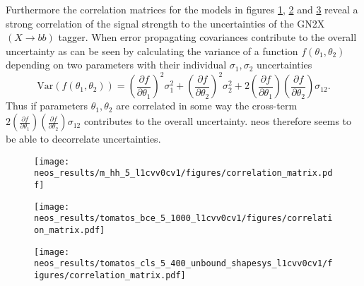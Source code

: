 Furthermore the correlation matrices for the models in figures \ref{fig:correlation_matrix_m_hh}, \ref{fig:correlation_matrix_bce} and \ref{fig:correlation_matrix_cls} reveal a strong correlation of the signal strength to the uncertainties of the GN2X $(X\rightarrow bb)$ tagger. When error propagating covariances contribute to the overall uncertainty as can be seen by calculating the variance of a function $f(\theta_1, \theta_2)$ depending on two parameters with their individual $\sigma_1,\sigma_2$ uncertainties
\begin{equation}
    \text{Var}(f(\theta_1, \theta_2)) = \left( \frac{\partial f}{\partial \theta_1} \right)^2 \sigma_1^2 + \left( \frac{\partial f}{\partial \theta_2} \right)^2 \sigma_2^2 + 2 \left( \frac{\partial f}{\partial \theta_1} \right) \left( \frac{\partial f}{\partial \theta_2} \right) \sigma_{12}.
\end{equation}
Thus if parameters $\theta_1, \theta_2$ are correlated in some way the cross-term \(2 \left( \frac{\partial f}{\partial \theta_1} \right) \left( \frac{\partial f}{\partial \theta_2} \right) \sigma_{12}\) contributes to the overall uncertainty. \ac{neos} therefore seems to be able to decorrelate uncertainties. 

\begin{figure}
    \centering
    \texttt{[image: neos\_results/m\_hh\_5\_l1cvv0cv1/figures/correlation\_matrix.pdf]}
    \caption[]{}
    \label{fig:correlation_matrix_m_hh}
\end{figure}
\begin{figure}
    \centering
    \texttt{[image: neos\_results/tomatos\_bce\_5\_1000\_l1cvv0cv1/figures/correlation\_matrix.pdf]}
    \caption[]{}
    \label{fig:correlation_matrix_bce}
\end{figure}
\begin{figure}
    \centering
    \texttt{[image: neos\_results/tomatos\_cls\_5\_400\_unbound\_shapesys\_l1cvv0cv1/figures/correlation\_matrix.pdf]}
    \caption[]{}
    \label{fig:correlation_matrix_cls}
\end{figure}

